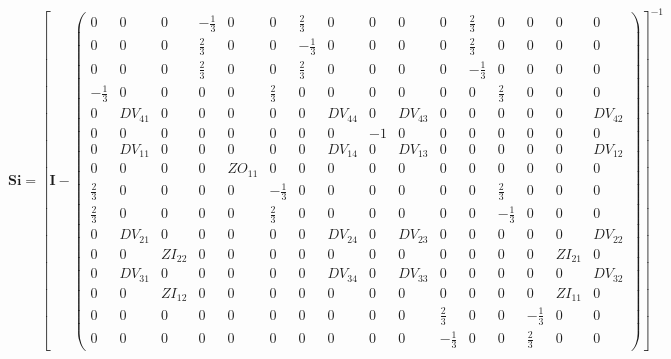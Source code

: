 \[ \mathbf{Si} =  \left[ \mathbf{I}  - \left(\begin{smallmatrix} 0 & 0 & 0 & -\frac{1}{3} & 0 & 0 & \frac{2}{3} & 0 & 0 & 0 & 0 & \frac{2}{3} & 0 & 0 & 0 & 0 \\ 0 & 0 & 0 & \frac{2}{3} & 0 & 0 & -\frac{1}{3} & 0 & 0 & 0 & 0 & \frac{2}{3} & 0 & 0 & 0 & 0 \\ 0 & 0 & 0 & \frac{2}{3} & 0 & 0 & \frac{2}{3} & 0 & 0 & 0 & 0 & -\frac{1}{3} & 0 & 0 & 0 & 0 \\ -\frac{1}{3} & 0 & 0 & 0 & 0 & \frac{2}{3} & 0 & 0 & 0 & 0 & 0 & 0 & \frac{2}{3} & 0 & 0 & 0 \\ 0 & DV_{41} & 0 & 0 & 0 & 0 & 0 & DV_{44} & 0 & DV_{43} & 0 & 0 & 0 & 0 & 0 & DV_{42} \\ 0 & 0 & 0 & 0 & 0 & 0 & 0 & 0 & -1 & 0 & 0 & 0 & 0 & 0 & 0 & 0 \\ 0 & DV_{11} & 0 & 0 & 0 & 0 & 0 & DV_{14} & 0 & DV_{13} & 0 & 0 & 0 & 0 & 0 & DV_{12} \\ 0 & 0 & 0 & 0 & ZO_{11} & 0 & 0 & 0 & 0 & 0 & 0 & 0 & 0 & 0 & 0 & 0 \\ \frac{2}{3} & 0 & 0 & 0 & 0 & -\frac{1}{3} & 0 & 0 & 0 & 0 & 0 & 0 & \frac{2}{3} & 0 & 0 & 0 \\ \frac{2}{3} & 0 & 0 & 0 & 0 & \frac{2}{3} & 0 & 0 & 0 & 0 & 0 & 0 & -\frac{1}{3} & 0 & 0 & 0 \\ 0 & DV_{21} & 0 & 0 & 0 & 0 & 0 & DV_{24} & 0 & DV_{23} & 0 & 0 & 0 & 0 & 0 & DV_{22} \\ 0 & 0 & ZI_{22} & 0 & 0 & 0 & 0 & 0 & 0 & 0 & 0 & 0 & 0 & 0 & ZI_{21} & 0 \\ 0 & DV_{31} & 0 & 0 & 0 & 0 & 0 & DV_{34} & 0 & DV_{33} & 0 & 0 & 0 & 0 & 0 & DV_{32} \\ 0 & 0 & ZI_{12} & 0 & 0 & 0 & 0 & 0 & 0 & 0 & 0 & 0 & 0 & 0 & ZI_{11} & 0 \\ 0 & 0 & 0 & 0 & 0 & 0 & 0 & 0 & 0 & 0 & \frac{2}{3} & 0 & 0 & -\frac{1}{3} & 0 & 0 \\ 0 & 0 & 0 & 0 & 0 & 0 & 0 & 0 & 0 & 0 & -\frac{1}{3} & 0 & 0 & \frac{2}{3} & 0 & 0 \end{smallmatrix}\right) \right]^{-1}  \]
